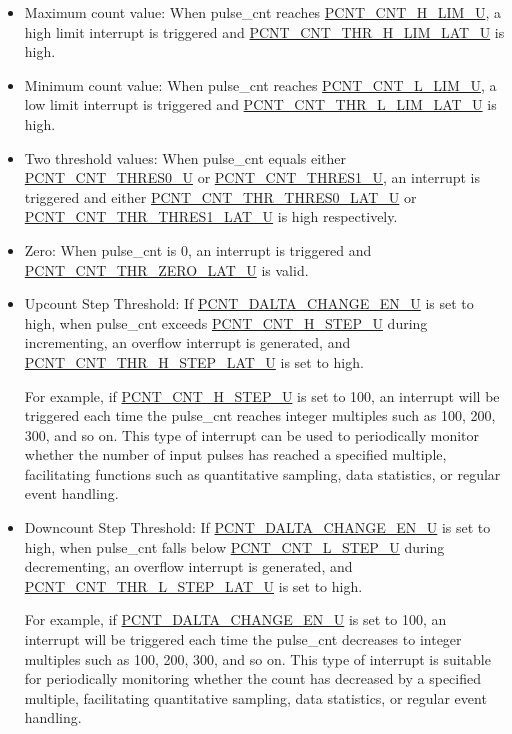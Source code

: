 \documentclass[main\_\_EN.tex]{subfiles}
\begin{document}
\begin{itemize}
    \item Maximum count value: When pulse\_cnt reaches \hyperref[fielddesc:PCNTCNTHLIMUN]{PCNT\_CNT\_H\_LIM\_U}, a high limit interrupt is triggered and \hyperref[fielddesc:PCNTCNTTHRHLIMLATUN]{PCNT\_CNT\_THR\_H\_LIM\_LAT\_U} is high.
    \item Minimum count value: When pulse\_cnt reaches \hyperref[fielddesc:PCNTCNTLLIMUN]{PCNT\_CNT\_L\_LIM\_U}, a low limit interrupt is triggered and \hyperref[fielddesc:PCNTCNTTHRLLIMLATUN]{PCNT\_CNT\_THR\_L\_LIM\_LAT\_U} is high.
    \item Two threshold values: When pulse\_cnt equals either \hyperref[fielddesc:PCNTCNTTHRES0UN]{PCNT\_CNT\_THRES0\_U} or \hyperref[fielddesc:PCNTCNTTHRES1UN]{PCNT\_CNT\_THRES1\_U}, an interrupt is triggered and either \hyperref[fielddesc:PCNTCNTTHRTHRES0LATUN]{PCNT\_CNT\_THR\_THRES0\_LAT\_U} or \hyperref[fielddesc:PCNTCNTTHRTHRES1LATUN]{PCNT\_CNT\_THR\_THRES1\_LAT\_U} is high respectively.
    \item Zero: When pulse\_cnt is 0, an interrupt is triggered and \hyperref[fielddesc:PCNTCNTTHRZEROLATUN]{PCNT\_CNT\_THR\_ZERO\_LAT\_U} is valid.
    \item Upcount Step Threshold: If \hyperref[fielddesc:PCNTDALTACHANGEENUN]{PCNT\_DALTA\_CHANGE\_EN\_U} is set to high, when pulse\_cnt exceeds \hyperref[fielddesc:PCNTCNTHSTEPUN]{PCNT\_CNT\_H\_STEP\_U} during incrementing, an overflow interrupt is generated, and \hyperref[fielddesc:PCNTCNTTHRHSTEPLATUN]{PCNT\_CNT\_THR\_H\_STEP\_LAT\_U} is set to high.

   For example, if \hyperref[fielddesc:PCNTCNTHSTEPUN]{PCNT\_CNT\_H\_STEP\_U} is set to 100, an interrupt will be triggered each time the pulse\_cnt reaches integer multiples such as 100, 200, 300, and so on. This type of interrupt can be used to periodically monitor whether the number of input pulses has reached a specified multiple, facilitating functions such as quantitative sampling, data statistics, or regular event handling.
    \item Downcount Step Threshold: If \hyperref[fielddesc:PCNTDALTACHANGEENUN]{PCNT\_DALTA\_CHANGE\_EN\_U} is set to high, when pulse\_cnt falls below \hyperref[fielddesc:PCNTCNTLSTEPUN]{PCNT\_CNT\_L\_STEP\_U} during decrementing, an overflow interrupt is generated, and \hyperref[fielddesc:PCNTCNTTHRLSTEPLATUN]{PCNT\_CNT\_THR\_L\_STEP\_LAT\_U} is set to high.

    For example, if \hyperref[fielddesc:PCNTDALTACHANGEENUN]{PCNT\_DALTA\_CHANGE\_EN\_U} is set to 100, an interrupt will be triggered each time the pulse\_cnt decreases to integer multiples such as 100, 200, 300, and so on. This type of interrupt is suitable for periodically monitoring whether the count has decreased by a specified multiple, facilitating quantitative sampling, data statistics, or regular event handling.
\end{itemize}
\end{document}
